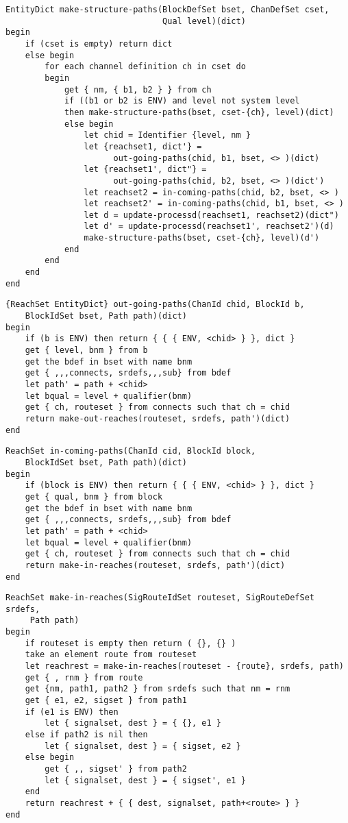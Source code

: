 \begin{verbatim}
EntityDict make-structure-paths(BlockDefSet bset, ChanDefSet cset,
                                Qual level)(dict)
begin
    if (cset is empty) return dict
    else begin
        for each channel definition ch in cset do
        begin
            get { nm, { b1, b2 } } from ch
            if ((b1 or b2 is ENV) and level not system level
            then make-structure-paths(bset, cset-{ch}, level)(dict)
            else begin
                let chid = Identifier {level, nm }
                let {reachset1, dict'} = 
                      out-going-paths(chid, b1, bset, <> )(dict)
                let {reachset1', dict"} = 
                      out-going-paths(chid, b2, bset, <> )(dict')
                let reachset2 = in-coming-paths(chid, b2, bset, <> )
                let reachset2' = in-coming-paths(chid, b1, bset, <> )
                let d = update-processd(reachset1, reachset2)(dict")
                let d' = update-processd(reachset1', reachset2')(d)
                make-structure-paths(bset, cset-{ch}, level)(d')
            end
        end
    end
end
\end{verbatim}

\begin{verbatim}
{ReachSet EntityDict} out-going-paths(ChanId chid, BlockId b,
    BlockIdSet bset, Path path)(dict)
begin
    if (b is ENV) then return { { { ENV, <chid> } }, dict }
    get { level, bnm } from b
    get the bdef in bset with name bnm
    get { ,,,connects, srdefs,,,sub} from bdef
    let path' = path + <chid>
    let bqual = level + qualifier(bnm)
    get { ch, routeset } from connects such that ch = chid
    return make-out-reaches(routeset, srdefs, path')(dict)
end
\end{verbatim}

\begin{verbatim}
ReachSet in-coming-paths(ChanId cid, BlockId block,
    BlockIdSet bset, Path path)(dict)
begin
    if (block is ENV) then return { { { ENV, <chid> } }, dict }
    get { qual, bnm } from block
    get the bdef in bset with name bnm
    get { ,,,connects, srdefs,,,sub} from bdef
    let path' = path + <chid>
    let bqual = level + qualifier(bnm)
    get { ch, routeset } from connects such that ch = chid
    return make-in-reaches(routeset, srdefs, path')(dict)
end
\end{verbatim}

\begin{verbatim}
ReachSet make-in-reaches(SigRouteIdSet routeset, SigRouteDefSet srdefs,
     Path path)
begin
    if routeset is empty then return ( {}, {} )
    take an element route from routeset
    let reachrest = make-in-reaches(routeset - {route}, srdefs, path)
    get { , rnm } from route
    get {nm, path1, path2 } from srdefs such that nm = rnm
    get { e1, e2, sigset } from path1
    if (e1 is ENV) then
        let { signalset, dest } = { {}, e1 }
    else if path2 is nil then
        let { signalset, dest } = { sigset, e2 }
    else begin
        get { ,, sigset' } from path2
        let { signalset, dest } = { sigset', e1 }
    end
    return reachrest + { { dest, signalset, path+<route> } }
end
\end{verbatim}

